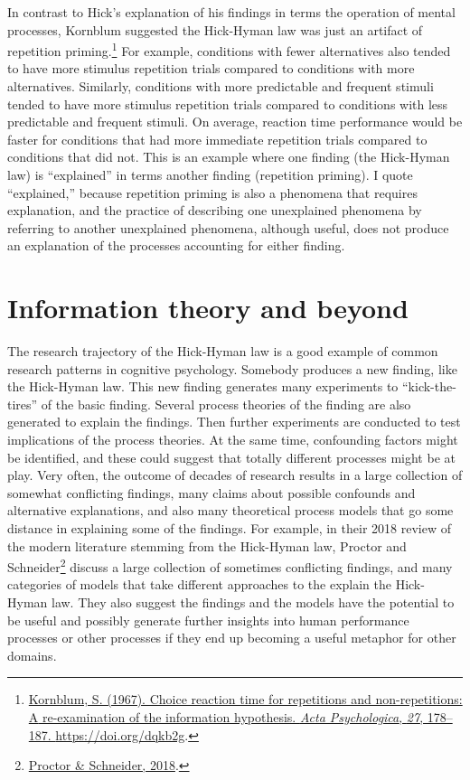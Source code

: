 \documentclass[
  oneside,
  12pt]{crumpbook}
\begin{document}
In contrast to Hick's explanation of his findings in terms the operation of mental processes, Kornblum suggested the Hick-Hyman law was just an artifact of repetition priming.\footnote{\protect\hyperlink{ref-kornblumChoiceReactionTime1967}{Kornblum, S. (1967). Choice reaction time for repetitions and non-repetitions: {A} re-examination of the information hypothesis. \emph{Acta Psychologica}, \emph{27}, 178--187. \url{https://doi.org/dqkb2g}}.} For example, conditions with fewer alternatives also tended to have more stimulus repetition trials compared to conditions with more alternatives. Similarly, conditions with more predictable and frequent stimuli tended to have more stimulus repetition trials compared to conditions with less predictable and frequent stimuli. On average, reaction time performance would be faster for conditions that had more immediate repetition trials compared to conditions that did not. This is an example where one finding (the Hick-Hyman law) is ``explained'' in terms another finding (repetition priming). I quote ``explained,'' because repetition priming is also a phenomena that requires explanation, and the practice of describing one unexplained phenomena by referring to another unexplained phenomena, although useful, does not produce an explanation of the processes accounting for either finding.

\hypertarget{information-theory-and-beyond}{%
\section{Information theory and beyond}\label{information-theory-and-beyond}}

The research trajectory of the Hick-Hyman law is a good example of common research patterns in cognitive psychology. Somebody produces a new finding, like the Hick-Hyman law. This new finding generates many experiments to ``kick-the-tires'' of the basic finding. Several process theories of the finding are also generated to explain the findings. Then further experiments are conducted to test implications of the process theories. At the same time, confounding factors might be identified, and these could suggest that totally different processes might be at play. Very often, the outcome of decades of research results in a large collection of somewhat conflicting findings, many claims about possible confounds and alternative explanations, and also many theoretical process models that go some distance in explaining some of the findings. For example, in their 2018 review of the modern literature stemming from the Hick-Hyman law, Proctor and Schneider\footnote{\protect\hyperlink{ref-proctorHickLawChoice2018}{Proctor \& Schneider, 2018}.} discuss a large collection of sometimes conflicting findings, and many categories of models that take different approaches to the explain the Hick-Hyman law. They also suggest the findings and the models have the potential to be useful and possibly generate further insights into human performance processes or other processes if they end up becoming a useful metaphor for other domains.
\end{document}

